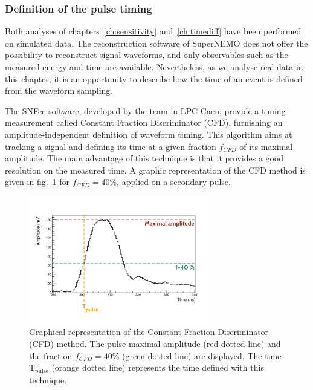 \subsubsection*{Definition of the pulse timing}

Both analyses of chapters~\ref{ch:sensitivity} and~\ref{ch:timediff} have been performed on simulated data.
The reconstruction software of SuperNEMO does not offer the possibility to reconstruct signal waveforms, and only observables such as the measured energy and time are available.
Nevertheless, as we analyse real data in this chapter, it is an opportunity to describe how the time of an event is defined from the waveform sampling.

The SNFee software, developed by the team in LPC Caen, provide a timing measurement called Constant Fraction Discriminator (CFD), furnishing an amplitude-independent definition of waveform timing.
This algorithm aims at tracking a signal and defining its time at a given fraction $f_{CFD}$ of its maximal amplitude.
The main advantage of this technique is that it provides a good resolution on the measured time.
A graphic representation of the CFD method is given in fig.~\ref{fig:CFD} for $f_{CFD}=40$\%, applied on a secondary pulse.
\begin{figure}[h!]
  \centering
  \includegraphics[trim={1.2cm 1.5cm 1.7cm 3.1cm},clip,width=0.7\textwidth]{commissioning/fig_commissioning/CFD_example_zoom.pdf}
  \caption{Graphical representation of the Constant Fraction Discriminator (CFD) method.
    The pulse maximal amplitude (red dotted line) and the fraction $f_{CFD}=40\%$ (green dotted line) are displayed.
    The time $\text{T}_{\text{pulse}}$ (orange dotted line) represents the time defined with this technique.
    \label{fig:CFD}}
\end{figure}

